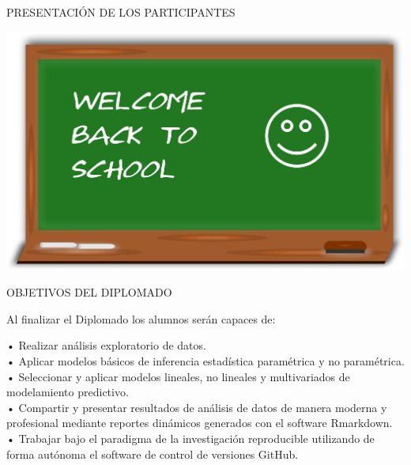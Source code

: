 \documentclass[
  ignorenonframetext,
]{beamer}
\begin{document}
\begin{frame}{PRESENTACIÓN DE LOS PARTICIPANTES}
\protect\hypertarget{presentaciuxf3n-de-los-participantes}{}

\includegraphics[width=1\linewidth]{Welcome}

\end{frame}

\begin{frame}{OBJETIVOS DEL DIPLOMADO}
\protect\hypertarget{objetivos-del-diplomado}{}

Al finalizar el Diplomado los alumnos serán capaces de:

• Realizar análisis exploratorio de datos.\\
• Aplicar modelos básicos de inferencia estadística paramétrica y no
paramétrica.\\
• Seleccionar y aplicar modelos lineales, no lineales y multivariados de
modelamiento predictivo.\\
• Compartir y presentar resultados de análisis de datos de manera
moderna y profesional mediante reportes dinámicos generados con el
software Rmarkdown.\\
• Trabajar bajo el paradigma de la investigación reproducible utilizando
de forma autónoma el software de control de versiones GitHub.

\end{frame}
\end{document}

